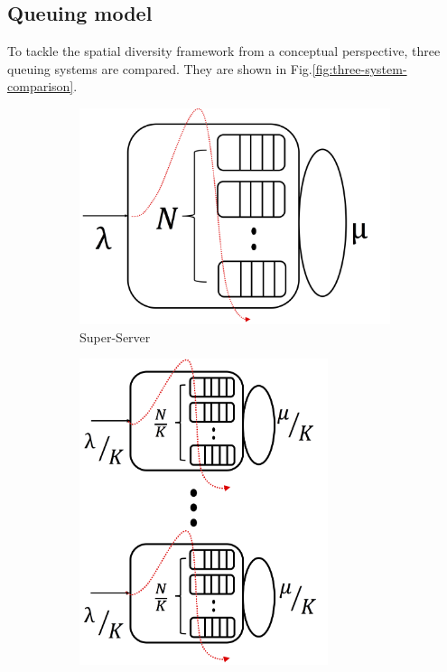 \subsection{Queuing model}
\label{sec:threesystemcomparison}
To tackle the spatial diversity framework from a conceptual perspective, three queuing systems are compared. They are shown in Fig.\ref{fig:three-system-comparison}. 
\begin{figure}
	\centering
	\begin{subfigure}[b]{0.3\textwidth}
		\centering
		\includegraphics[width=\textwidth]{Chapter3/Figures/switchone}
		\smallskip
		\caption{Super-Server}
		\label{fig:switchone}
	\end{subfigure}
	\hfill
	\begin{subfigure}[b]{0.3\textwidth}
		\centering
		\includegraphics[width=0.8\textwidth]{Chapter3/Figures/esn}

\end{subfigure}
\end{figure}
